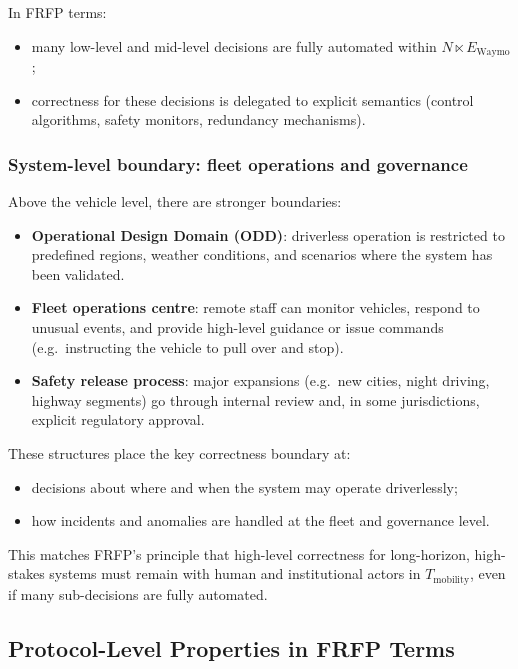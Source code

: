 In FRFP terms:

\begin{itemize}
  \item many low-level and mid-level decisions are fully automated within
        \(N \ltimes E_{\mathrm{Waymo}}\);
  \item correctness for these decisions is delegated to explicit semantics
        (control algorithms, safety monitors, redundancy mechanisms).
\end{itemize}

\subsubsection*{System-level boundary: fleet operations and governance}

Above the vehicle level, there are stronger boundaries:

\begin{itemize}
  \item \textbf{Operational Design Domain (ODD)}:
        driverless operation is restricted to predefined regions, weather
        conditions, and scenarios where the system has been validated.
  \item \textbf{Fleet operations centre}:
        remote staff can monitor vehicles, respond to unusual events, and
        provide high-level guidance or issue commands (e.g.\ instructing
        the vehicle to pull over and stop).
  \item \textbf{Safety release process}:
        major expansions (e.g.\ new cities, night driving, highway segments)
        go through internal review and, in some jurisdictions, explicit
        regulatory approval.
\end{itemize}

These structures place the key correctness boundary at:

\begin{itemize}
  \item decisions about where and when the system may operate driverlessly;
  \item how incidents and anomalies are handled at the fleet and governance
        level.
\end{itemize}

This matches FRFP’s principle that high-level correctness for long-horizon,
high-stakes systems must remain with human and institutional actors in
\(T_{\mathrm{mobility}}\), even if many sub-decisions are fully automated.

\subsection{Protocol-Level Properties in FRFP Terms}

